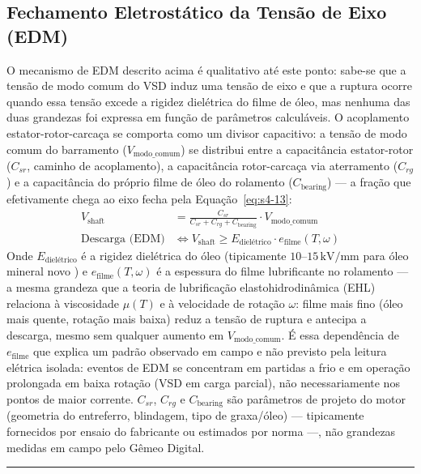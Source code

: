 \documentclass[12pt,a4paper]{article}
\numberwithin{equation}{section}
\numberwithin{table}{section}
\numberwithin{figure}{section}
\begin{document}
{	\subsection{\textbf{Fechamento Eletrostático da Tensão de Eixo (EDM)}}
	O mecanismo de EDM descrito acima é qualitativo até este ponto: sabe-se que a tensão de modo comum do VSD induz uma tensão de eixo e que a ruptura ocorre quando essa tensão excede a rigidez dielétrica do filme de óleo, mas nenhuma das duas grandezas foi expressa em função de parâmetros calculáveis. O acoplamento estator-rotor-carcaça se comporta como um divisor capacitivo: a tensão de modo comum do barramento ($V_{\text{modo\_comum}}$) se distribui entre a capacitância estator-rotor ($C_{sr}$, caminho de acoplamento), a capacitância rotor-carcaça via aterramento ($C_{rg}$) e a capacitância do próprio filme de óleo do rolamento ($C_{\text{bearing}}$) — a fração que efetivamente chega ao eixo fecha pela Equação~\eqref{eq:s4-13}:
	\begin{equation}\label{eq:s4-13}
	\begin{aligned}
		V_{\text{shaft}} &= \frac{C_{sr}}{C_{sr} + C_{rg} + C_{\text{bearing}}} \cdot V_{\text{modo\_comum}} \\[4pt]
		\text{Descarga (EDM)} &\iff V_{\text{shaft}} \geq E_{\text{dielétrico}} \cdot e_{\text{filme}}(T, \omega)
	\end{aligned}
\end{equation}
	Onde $E_{\text{dielétrico}}$ é a rigidez dielétrica do óleo (tipicamente $10$--$15\,\text{kV/mm}$ para óleo mineral novo \cite{erdman}) e $e_{\text{filme}}(T, \omega)$ é a espessura do filme lubrificante no rolamento — a mesma grandeza que a teoria de lubrificação elastohidrodinâmica (EHL) relaciona à viscosidade $\mu(T)$ e à velocidade de rotação $\omega$: filme mais fino (óleo mais quente, rotação mais baixa) reduz a tensão de ruptura e antecipa a descarga, mesmo sem qualquer aumento em $V_{\text{modo\_comum}}$. É essa dependência de $e_{\text{filme}}$ que explica um padrão observado em campo e não previsto pela leitura elétrica isolada: eventos de EDM se concentram em partidas a frio e em operação prolongada em baixa rotação (VSD em carga parcial), não necessariamente nos pontos de maior corrente. $C_{sr}$, $C_{rg}$ e $C_{\text{bearing}}$ são parâmetros de projeto do motor (geometria do entreferro, blindagem, tipo de graxa/óleo) — tipicamente fornecidos por ensaio do fabricante ou estimados por norma \cite{erdman} —, não grandezas medidas em campo pelo Gêmeo Digital.

	\vspace{1em}
	\hrule
	\vspace{1em}

}
\end{document}
